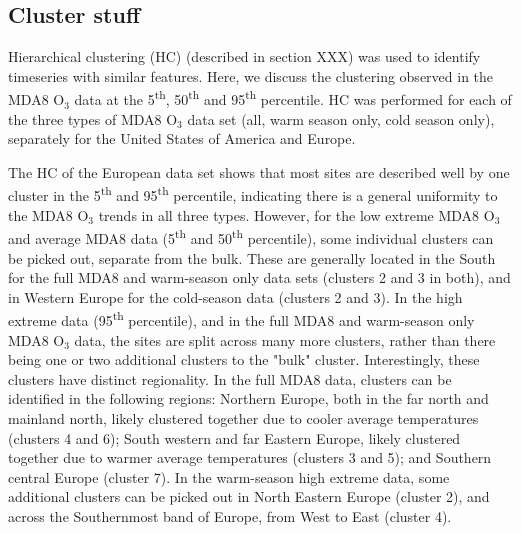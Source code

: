 \documentclass[journal abbreviation, manuscript]{copernicus}
\begin{document}
\subsection{Cluster stuff} \label{sect:cluster_stuff}
Hierarchical clustering (HC) (described in section XXX) was used to identify timeseries with similar features. Here, we discuss the clustering observed in the MDA8 O$_3$ data at the 5\textsuperscript{th}, 50\textsuperscript{th} and 95\textsuperscript{th} percentile. HC was performed for each of the three types of MDA8 O$_3$ data set (all, warm season only, cold season only), separately for the United States of America and Europe. 

The HC of the European data set shows that most sites are described well by one cluster in the 5\textsuperscript{th} and 95\textsuperscript{th} percentile, indicating there is a general uniformity to the MDA8 O$_3$ trends in all three types. However, for the low extreme MDA8 O$_3$ and average MDA8 data (5\textsuperscript{th} and 50\textsuperscript{th} percentile), some individual clusters can be picked out, separate from the bulk. These are generally located in the South for the full MDA8 and warm-season only data sets (clusters 2 and 3 in both), and in Western Europe for the cold-season data (clusters 2 and 3). In the high extreme data (95\textsuperscript{th} percentile), and in the full MDA8 and warm-season only MDA8 O$_3$ data, the sites are split across many more clusters, rather than there being one or two additional clusters to the "bulk" cluster. Interestingly, these clusters have distinct regionality. In the full MDA8 data, clusters can be identified in the following regions: Northern Europe, both in the far north and mainland north, likely clustered together due to cooler average temperatures (clusters 4 and 6); South western and far Eastern Europe, likely clustered together due to warmer average temperatures (clusters 3 and 5); and Southern central Europe (cluster 7). In the warm-season high extreme data, some additional clusters can be picked out in North Eastern Europe (cluster 2), and across the Southernmost band of Europe, from West to East (cluster 4).





\end{document}
